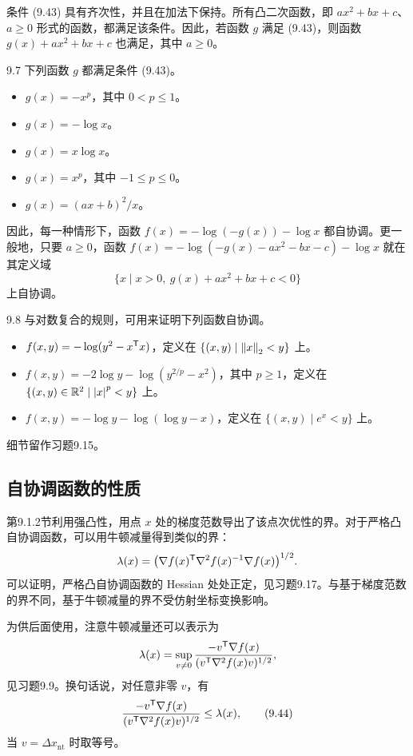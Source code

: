 条件 (9.43) 具有齐次性，并且在加法下保持。所有凸二次函数，即 $ax^2+bx+c$、$a\ge0$ 形式的函数，都满足该条件。因此，若函数 $g$ 满足 (9.43)，则函数 $g(x)+ax^2+bx+c$ 也满足，其中 $a\ge0$。

\begin{origexample}{9.7}
下列函数 $g$ 都满足条件 (9.43)。
\begin{itemize}
\item $g(x)=-x^p$，其中 $0<p\le1$。
\item $g(x)=-\log x$。
\item $g(x)=x\log x$。
\item $g(x)=x^p$，其中 $-1\le p\le0$。
\item $g(x)=(ax+b)^2/x$。
\end{itemize}
因此，每一种情形下，函数 $f(x)=-\log(-g(x))-\log x$ 都自协调。更一般地，只要 $a\ge0$，函数 $f(x)=-\log(-g(x)-ax^2-bx-c)-\log x$ 就在其定义域
\[
 \{x\mid x>0,\ g(x)+ax^2+bx+c<0\}
\]
上自协调。
\end{origexample}

\begin{origexample}{9.8}
与对数复合的规则，可用来证明下列函数自协调。
\begin{itemize}
\item $f(x,y)=-\log(y^2-x^\mathsf T x)$，定义在 $\{(x,y)\mid\left\lVert x\right\rVert_2<y\}$ 上。
\item $f(x,y)=-2\log y-\log(y^{2/p}-x^2)$，其中 $p\ge1$，定义在 $\{(x,y)\in\mathbb R^2\mid\left\lvert x\right\rvert^p<y\}$ 上。
\item $f(x,y)=-\log y-\log(\log y-x)$，定义在 $\{(x,y)\mid e^x<y\}$ 上。
\end{itemize}
细节留作习题9.15。
\end{origexample}

\subsection{自协调函数的性质}
第9.1.2节利用强凸性，用点 $x$ 处的梯度范数导出了该点次优性的界。对于严格凸自协调函数，可以用牛顿减量得到类似的界：
\[
 \lambda(x)=\bigl(\nabla f(x)^\mathsf T\nabla^2f(x)^{-1}\nabla f(x)\bigr)^{1/2}.
\]
可以证明，严格凸自协调函数的 Hessian 处处正定，见习题9.17。与基于梯度范数的界不同，基于牛顿减量的界不受仿射坐标变换影响。

为供后面使用，注意牛顿减量还可以表示为
\[
 \lambda(x)=\sup_{v\ne0}\frac{-v^\mathsf T\nabla f(x)}{(v^\mathsf T\nabla^2f(x)v)^{1/2}},
\]
见习题9.9。换句话说，对任意非零 $v$，有
\begin{equation}
 \frac{-v^\mathsf T\nabla f(x)}{(v^\mathsf T\nabla^2f(x)v)^{1/2}}\le\lambda(x),\tag{9.44}
\end{equation}
当 $v=\Delta x_{\mathrm{nt}}$ 时取等号。

